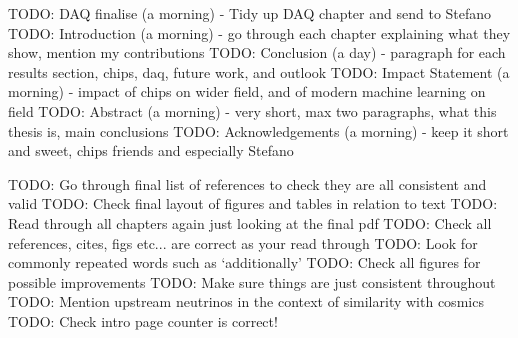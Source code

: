 TODO: DAQ finalise (a morning) - Tidy up DAQ chapter and send to Stefano 
TODO: Introduction (a morning) - go through each chapter explaining what they show, mention my contributions
TODO: Conclusion (a day) - paragraph for each results section, chips, daq, future work, and outlook
TODO: Impact Statement (a morning) - impact of chips on wider field, and of modern machine learning on field
TODO: Abstract (a morning) - very short, max two paragraphs, what this thesis is, main conclusions
TODO: Acknowledgements (a morning) - keep it short and sweet, chips friends and especially Stefano

TODO: Go through final list of references to check they are all consistent and valid
TODO: Check final layout of figures and tables in relation to text
TODO: Read through all chapters again just looking at the final pdf
TODO: Check all references, cites, figs etc... are correct as your read through
TODO: Look for commonly repeated words such as `additionally'
TODO: Check all figures for possible improvements
TODO: Make sure things are just consistent throughout
TODO: Mention upstream neutrinos in the context of similarity with cosmics
TODO: Check intro page counter is correct!
